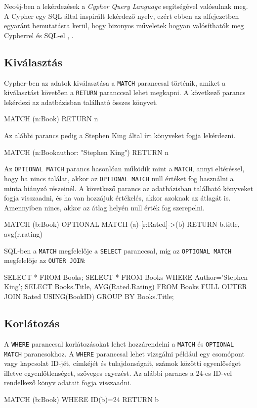 
Neo4j-ben a lekérdezések a \textit{Cypher Query Language} segítségével valósulnak meg. A Cypher egy SQL által inspirált lekérdező nyelv, ezért ebben az alfejezetben egyaránt bemutatásra kerül, hogy bizonyos műveletek hogyan valósíthatók meg Cypherrel és SQL-el \cite{cypher}, \cite{sql}.

\subsection{Kiválasztás}

Cypher-ben az adatok kiválasztása a \texttt{MATCH} paranccsal történik, amiket a kiválasztást követően a \texttt{RETURN} paranccsal lehet megkapni. A következő parancs lekérdezi az adatbázisban található összes könyvet.
\begin{java}[columns=fullflexible]
MATCH (n:Book) RETURN n
\end{java}
Az alábbi parancs pedig a Stephen King által írt könyveket fogja lekérdezni.
\begin{java}[columns=fullflexible]
MATCH (n:Book{author: "Stephen King"}) RETURN n
\end{java}
Az \texttt{OPTIONAL MATCH} parancs hasonlóan működik mint a \texttt{MATCH}, annyi eltéréssel, hogy ha nincs találat, akkor az \texttt{OPTIONAL MATCH} null értéket fog használni a minta hiányzó részeinél. A következő parancs az adatbázisban található könyveket fogja visszaadni, és ha van hozzájuk értékelés, akkor azoknak az átlagát is. Amennyiben nincs, akkor az átlag helyén null érték fog szerepelni.
\begin{java}[columns=fullflexible]
MATCH (b:Book) 
OPTIONAL MATCH (a)-[r:Rated]->(b) 
RETURN b.title, avg(r.rating)
\end{java}
SQL-ben a \texttt{MATCH} megfelelője a \texttt{SELECT} paranccsal, míg az \texttt{OPTIONAL MATCH} megfelelője az \texttt{OUTER JOIN}:
\begin{java}[columns=fullflexible]
SELECT * FROM Books;
SELECT * FROM Books WHERE Author='Stephen King';
SELECT Books.Title, AVG(Rated.Rating) FROM Books 
FULL OUTER JOIN Rated USING(BookID) GROUP BY Books.Title;
\end{java}

\subsection{Korlátozás}
A \texttt{WHERE} paranccsal korlátozásokat lehet hozzárendelni a \texttt{MATCH} és \texttt{OPTIONAL MATCH} parancsokhoz. A \texttt{WHERE} paranccsal lehet vizsgálni például egy csomópont vagy kapcsolat ID-jét, címkéjét és tulajdonságait, számok közötti egyenlőséget illetve egyenlőtlenséget, szöveges egyezést. Az alábbi parancs a 24-es ID-vel rendelkező könyv adatait fogja visszaadni.
\begin{java}[columns=fullflexible]
MATCH (b:Book) 
WHERE ID(b)=24
RETURN b
\end{java}

